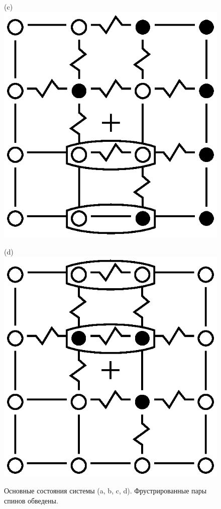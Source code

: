 \documentclass[utf8, babel, sor, jor, amsmath, amssymb, reprint]{elsarticle} %
\begin{document}
\begin{figure}[H]
\begin{minipage}[h]{0.2\linewidth}
	\end{minipage}
	\hfill
	\begin{minipage}[h]{0.2\linewidth}
		\centering(c)
		\includegraphics[width=1\linewidth]{pictures/Cl1_Type2_gs3.eps}
	\end{minipage}
	\hfill
	\begin{minipage}[h]{0.2\linewidth}
		\centering(d)
		\includegraphics[width=1\linewidth]{pictures/Cl1_Type2_gs4.eps}
	\end{minipage}
	\caption{Основные состояния системы (a, b, c, d). Фрустрированные пары спинов обведены.}
	\label{fig:4x4.1}
	
\end{figure}
\end{document}
